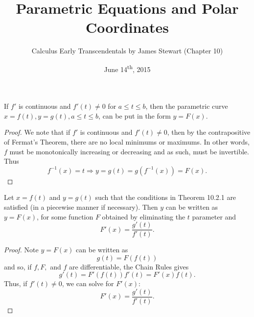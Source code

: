\documentclass[a4paper,11pt]{article}
\title{Parametric Equations and Polar Coordinates}
\author{Calculus Early Transcendentals by James Stewart (Chapter 10)}
\date{June 14\textsuperscript{th}, 2015}
\begin{document}
\maketitle
{}

\begin{outline}

    If \(f'\) is continuous and \(f'(t) \neq 0\) for \(a \leq t \leq b\), then the parametric curve \(x = f(t),
    y = g(t), a \leq t \leq b\), can be put in the form \(y = F(x)\).
    
    \begin{proof}
      We note that if \(f'\) is continuous and \(f'(t) \neq 0\), then by the contrapositive of Fermat's Theorem, 
      there are no local minimums or maximums. In other words, \(f\) must be monotonically increasing or decreasing
      and as such, must be invertible. Thus \[f^{-1}(x) = t \Rightarrow y = g(t) = g(f^{-1}(x)) = F(x)\text{.}\]
    \end{proof}
    
    Let \(x = f(t)\) and \(y = g(t)\) such that the conditions in Theorem 10.2.1 are satisfied (in a piecewise
    manner if necessary). Then \(y\) can be written as \(y = F(x)\), for some function \(F\) obtained by eliminating 
    the \(t\) parameter and \[ F'(x) = \frac{g'(t)}{f'(t)}\text{.} \]
    
    \begin{proof}
      Note \(y = F(x)\) can be written as \[ g(t) = F(f(t)) \] and so, if \(f, F,\) and \(f\) are differentiable, 
      the Chain Rules gives \[ g'(t) = F'(f(t))f'(t) = F'(x)f(t)\text{.} \] Thus, if \(f'(t) \neq 0\), we can 
      solve for \(F'(x)\): \[ F'(x) = \frac{g'(t)}{f'(t)}\text{.} \]
    \end{proof}

\end{outline}
\end{document}
